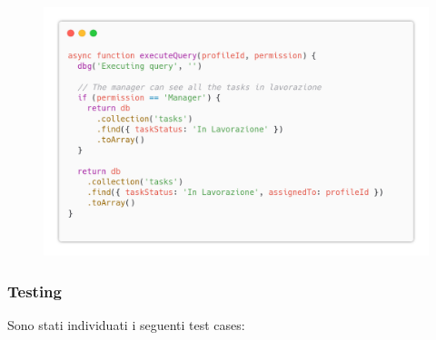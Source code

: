 \documentclass{report}
\begin{document}
\begin{figure}[H]
	\centering\includegraphics[width=1\textwidth]{images/code_in_lavorazione2.png}
\end{figure}

\subsubsection*{Testing}

Sono stati individuati i seguenti test cases:
\end{document}
